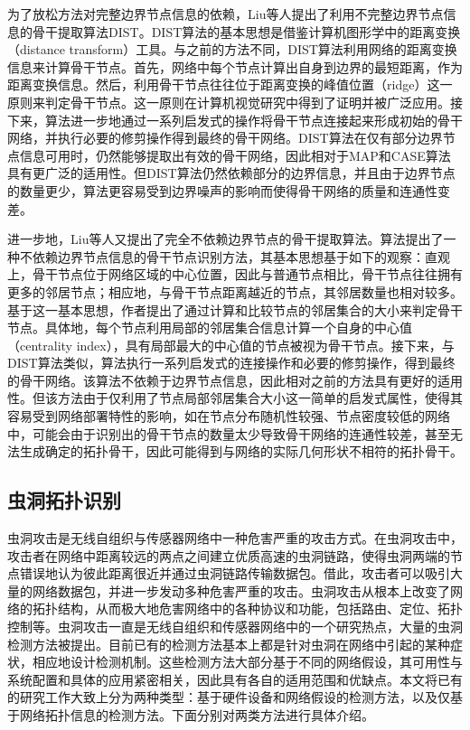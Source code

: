 为了放松方法对完整边界节点信息的依赖，Liu等人提出了利用不完整边界节点信息的骨干提取算法DIST。DIST算法的基本思想是借鉴计算机图形学中的距离变换（distance transform）工具。与之前的方法不同，DIST算法利用网络的距离变换信息来计算骨干节点。首先，网络中每个节点计算出自身到边界的最短距离，作为距离变换信息。然后，利用骨干节点往往位于距离变换的峰值位置（ridge）这一原则来判定骨干节点。这一原则在计算机视觉研究中得到了证明并被广泛应用。接下来，算法进一步地通过一系列启发式的操作将骨干节点连接起来形成初始的骨干网络，并执行必要的修剪操作得到最终的骨干网络。DIST算法在仅有部分边界节点信息可用时，仍然能够提取出有效的骨干网络，因此相对于MAP和CASE算法具有更广泛的适用性。但DIST算法仍然依赖部分的边界信息，并且由于边界节点的数量更少，算法更容易受到边界噪声的影响而使得骨干网络的质量和连通性变差。

进一步地，Liu等人又提出了完全不依赖边界节点的骨干提取算法。算法提出了一种不依赖边界节点信息的骨干节点识别方法，其基本思想基于如下的观察：直观上，骨干节点位于网络区域的中心位置，因此与普通节点相比，骨干节点往往拥有更多的邻居节点；相应地，与骨干节点距离越近的节点，其邻居数量也相对较多。基于这一基本思想，作者提出了通过计算和比较节点的邻居集合的大小来判定骨干节点。具体地，每个节点利用局部的邻居集合信息计算一个自身的中心值（centrality index），具有局部最大的中心值的节点被视为骨干节点。接下来，与DIST算法类似，算法执行一系列启发式的连接操作和必要的修剪操作，得到最终的骨干网络。该算法不依赖于边界节点信息，因此相对之前的方法具有更好的适用性。但该方法由于仅利用了节点局部邻居集合大小这一简单的启发式属性，使得其容易受到网络部署特性的影响，如在节点分布随机性较强、节点密度较低的网络中，可能会由于识别出的骨干节点的数量太少导致骨干网络的连通性较差，甚至无法生成确定的拓扑骨干，因此可能得到与网络的实际几何形状不相符的拓扑骨干。
\subsection{虫洞拓扑识别}
虫洞攻击是无线自组织与传感器网络中一种危害严重的攻击方式。在虫洞攻击中，攻击者在网络中距离较远的两点之间建立优质高速的虫洞链路，使得虫洞两端的节点错误地认为彼此距离很近并通过虫洞链路传输数据包。借此，攻击者可以吸引大量的网络数据包，并进一步发动多种危害严重的攻击。虫洞攻击从根本上改变了网络的拓扑结构，从而极大地危害网络中的各种协议和功能，包括路由、定位、拓扑控制等。虫洞攻击一直是无线自组织和传感器网络中的一个研究热点，大量的虫洞检测方法被提出。目前已有的检测方法基本上都是针对虫洞在网络中引起的某种症状，相应地设计检测机制。这些检测方法大部分基于不同的网络假设，其可用性与系统配置和具体的应用紧密相关，因此具有各自的适用范围和优缺点。本文将已有的研究工作大致上分为两种类型：基于硬件设备和网络假设的检测方法，以及仅基于网络拓扑信息的检测方法。下面分别对两类方法进行具体介绍。

